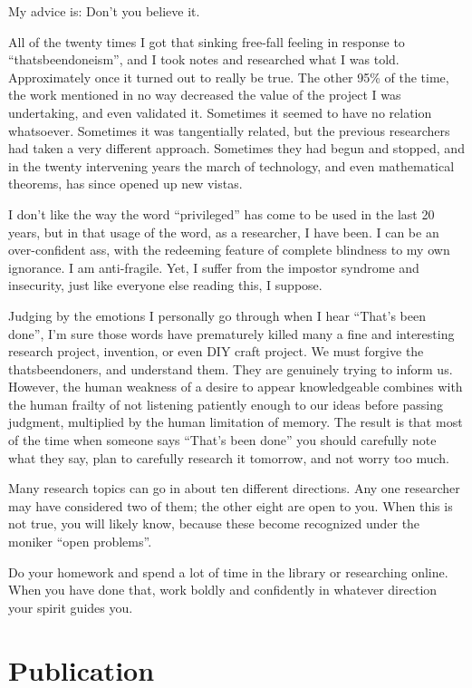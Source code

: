 \documentclass[
	fontsize=10pt, %
	twoside=false, %
	secnumdepth=1, %
]{kaobook}
\begin{document}
My advice is: Don’t you believe it.

All of the twenty times I got that sinking free-fall feeling in
response to “thatsbeendoneism”, and I took notes and researched what I
was told. Approximately once it turned out to really be true.  The
other 95\% of the time, the work mentioned in no way decreased the
value of the project I was undertaking, and even validated
it. Sometimes it seemed to have no relation whatsoever. Sometimes it
was tangentially related, but the previous researchers had taken a
very different approach. Sometimes they had begun and stopped, and in
the twenty intervening years the march of technology, and even
mathematical theorems, has since opened up new vistas.

I don’t like the way the word “privileged” has come to be used in the
last 20 years, but in that usage of the word, as a researcher, I have
been. I can be an over-confident ass, with the redeeming feature of
complete blindness to my own ignorance. I am anti-fragile. Yet, I
suffer from the impostor syndrome and insecurity, just like everyone
else reading this, I suppose.

Judging by the emotions I personally go through when I hear “That’s
been done”, I’m sure those words have prematurely killed many a fine
and interesting research project, invention, or even DIY craft
project.  We must forgive the thatsbeendoners, and understand
them. They are genuinely trying to inform us. However, the human
weakness of a desire to appear knowledgeable combines with the human
frailty of not listening patiently enough to our ideas before passing
judgment, multiplied by the human limitation of memory. The result is
that most of the time when someone says “That’s been done” you should
carefully note what they say, plan to carefully research it tomorrow,
and not worry too much.

Many research topics can go in about ten different directions. Any one
researcher may have considered two of them; the other eight are open
to you. When this is not true, you will likely know, because these
become recognized under the moniker “open problems”.

Do your homework and spend a lot of time in the library or researching
online. When you have done that, work boldly and confidently in
whatever direction your spirit guides you.

\section{Publication}
\end{document}
